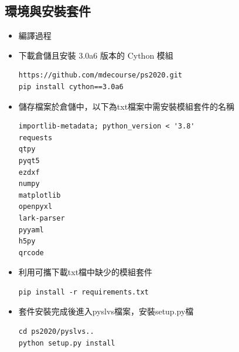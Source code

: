 \documentclass[14pt,a4paper]{report}  %
\newcommand{\fourteen}{\fontsize{14pt}{\baselineskip}\selectfont}%
\begin{document}
{\subsection{環境與安裝套件}
		\begin{itemize}		
		\item{編譯過程}\\     
		\fourteen {下載已經建立開發環境的套件(如:Mysy2程式、python38、solvespace)的可攜kmol-project檔案，之後安裝3.0a6版本的Cython模組以便進行Pyslvs編譯，另外安裝環境缺少的套件(如: PyQt、Numpy)，完成開發環境的架構後下載ps2020檔案，進入ps2020中在Makefile中進行編譯，完成後進入ps2020中Pyslvs檔案夾安裝setup.py檔，此動作主要壓縮並包裝檔案於資料夾中，最後回到ps2020根目錄再次安裝下載setup.py為使整個環境、編譯動態連結庫封裝成Pyslvs.exe執行檔，最後只需打Pyslvs即可呼叫啟動位於資料夾中的Pyslvs.exe執行檔，出現在畫面中的頁面為編譯完成後的結果。} 

		\item 下載倉儲且安裝 3.0a6 版本的 Cython 模組
		\begin{lstlisting}[caption=下載倉儲安裝Cython]
https://github.com/mdecourse/ps2020.git
pip install cython==3.0a6
		\end{lstlisting}
		\end{itemize}

		\begin{itemize}
		\item 儲存檔案於倉儲中，以下為txt檔案中需安裝模組套件的名稱
		\begin{lstlisting}[caption=安裝模組套件]
importlib-metadata; python_version < '3.8'
requests
qtpy
pyqt5
ezdxf
numpy
matplotlib
openpyxl
lark-parser
pyyaml
h5py
qrcode
		\end{lstlisting}
		\end{itemize}
		
		\begin{itemize}
		\item 利用可攜下載txt檔中缺少的模組套件
		\begin{lstlisting}[caption=安裝模組套件指令]
pip install -r requirements.txt
		\end{lstlisting}
		\end{itemize}
		
		\begin{itemize}
		\item 套件安裝完成後進入pyslvs檔案，安裝setup.py檔
		\begin{lstlisting}[caption=安裝步驟]
cd ps2020/pyslvs..
python setup.py install
		\end{lstlisting}
		\end{itemize}
		
}
\end{document}
